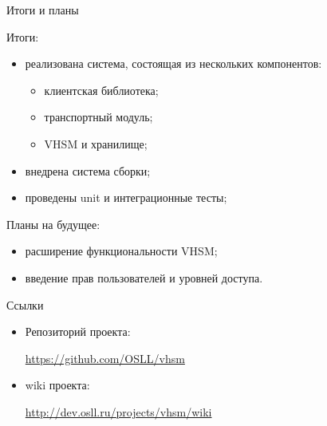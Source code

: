 \documentclass[utf8, 11pt]{beamer}
\begin{document}
\begin{frame}{Итоги и планы}

Итоги:
\begin{itemize}
\item реализована система, состоящая из нескольких компонентов:
\begin{itemize}
	\item клиентская библиотека;
	\item транспортный модуль;
	\item VHSM и хранилище;
\end{itemize}
\item внедрена система сборки;
\item проведены unit и интеграционные тесты;
\end{itemize}

\vspace*{\fill}

Планы на будущее:
\begin{itemize}
\item расширение функциональности VHSM;
\item введение прав пользователей и уровней доступа.
\end{itemize}

\vspace*{\fill}

\end{frame}

\begin{frame}{Ссылки}
\begin{itemize}
\item Репозиторий проекта:

\url{https://github.com/OSLL/vhsm}

\item wiki проекта:

\url{http://dev.osll.ru/projects/vhsm/wiki}
\end{itemize}

\vspace*{\fill}

\end{frame}
\end{document}
